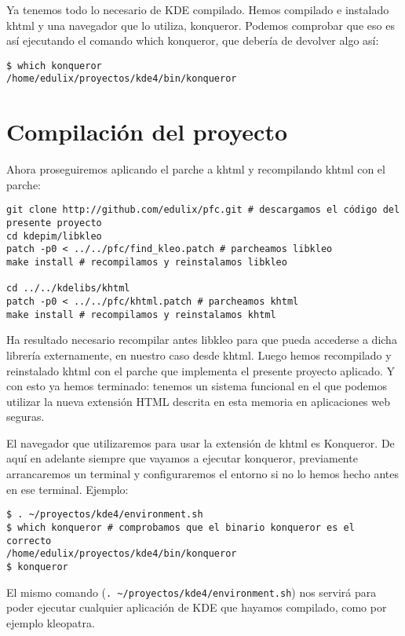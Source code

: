 Ya tenemos todo lo necesario de KDE compilado. Hemos compilado e instalado khtml y una navegador que lo utiliza, konqueror. Podemos comprobar que eso es así ejecutando el comando which konqueror, que debería de devolver algo así:

\begin{verbatim}
$ which konqueror
/home/edulix/proyectos/kde4/bin/konqueror 
\end{verbatim}

\section{Compilación del proyecto}

Ahora proseguiremos aplicando el parche a khtml y recompilando khtml con el parche:

\begin{verbatim}
git clone http://github.com/edulix/pfc.git # descargamos el código del presente proyecto
cd kdepim/libkleo
patch -p0 < ../../pfc/find_kleo.patch # parcheamos libkleo
make install # recompilamos y reinstalamos libkleo

cd ../../kdelibs/khtml
patch -p0 < ../../pfc/khtml.patch # parcheamos khtml
make install # recompilamos y reinstalamos khtml
\end{verbatim}

Ha resultado necesario recompilar antes libkleo para que pueda accederse a dicha librería externamente, en nuestro caso desde khtml. Luego hemos recompilado y reinstalado khtml con el parche que implementa el presente proyecto aplicado. Y con esto ya hemos terminado: tenemos un sistema funcional en el que podemos utilizar la nueva extensión HTML descrita en esta memoria en aplicaciones web seguras.

El navegador que utilizaremos para usar la extensión de khtml es Konqueror. De aquí en adelante siempre que vayamos a ejecutar konqueror, previamente arrancaremos un terminal y configuraremos el entorno si no lo hemos hecho antes en ese terminal. Ejemplo:

\begin{verbatim}
$ . ~/proyectos/kde4/environment.sh
$ which konqueror # comprobamos que el binario konqueror es el correcto
/home/edulix/proyectos/kde4/bin/konqueror 
$ konqueror
\end{verbatim}

El mismo comando (\verb|. ~/proyectos/kde4/environment.sh|) nos servirá para poder ejecutar cualquier aplicación de KDE que hayamos compilado, como por ejemplo kleopatra.

